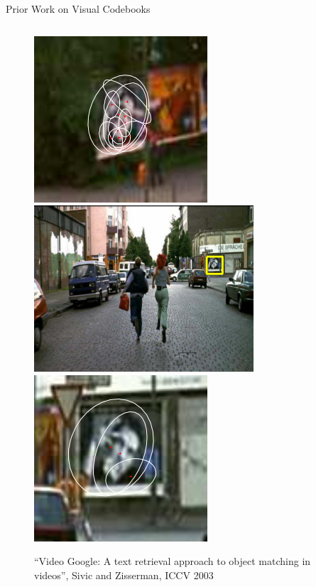 \documentclass[mathserif]{beamer}
\begin{document}
\begin{frame}{Prior Work on Visual Codebooks}
\begin{columns}
\begin{column}{.5\textwidth}
\begin{figure}
                \includegraphics[width=.4\textwidth]{illustrations/related_work/video_google/query_1_small}\\
                \includegraphics[width=.4\textwidth]{illustrations/related_work/video_google/query_2_large}
                \includegraphics[width=.4\textwidth]{illustrations/related_work/video_google/query_2_small}
                \caption{``Video Google: A text retrieval approach to object matching in videos'', Sivic and Zisserman, ICCV 2003}
            \end{figure}
        \end{column}
    \end{columns}
\end{frame}

\end{document}
